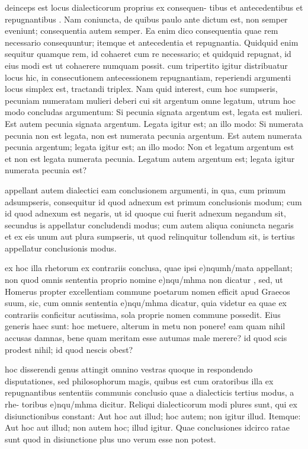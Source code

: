  deinceps est locus dialecticorum proprius ex consequen- tibus et antecedentibus et repugnantibus . Nam coniuncta, de quibus paulo ante dictum est, non semper eveniunt; consequentia autem semper. Ea enim dico consequentia quae rem necessario consequuntur; itemque et antecedentia et repugnantia. Quidquid enim sequitur quamque rem, id cohaeret cum re necessario; et quidquid repugnat, id eius modi est ut cohaerere numquam possit. cum tripertito igitur distribuatur locus hic, in consecutionem antecessionem repugnantiam, reperiendi argumenti locus simplex est, tractandi triplex. Nam quid interest, cum hoc sumpseris, pecuniam numeratam mulieri deberi cui sit argentum omne legatum, utrum hoc modo concludas argumentum: Si pecunia signata argentum est, legata est mulieri. Est autem pecunia signata argentum. Legata igitur est; an illo modo: Si numerata pecunia non est legata, non est numerata pecunia argentum. Est autem numerata pecunia argentum; legata igitur est; an illo modo: Non et legatum argentum est et non est legata numerata pecunia. Legatum autem argentum est; legata igitur numerata pecunia est?

 appellant autem dialectici eam conclusionem argumenti, in qua, cum primum adsumpseris, consequitur id quod adnexum est primum conclusionis modum; cum id quod adnexum est negaris, ut id quoque cui fuerit adnexum negandum sit, secundus is appellatur concludendi modus; cum autem aliqua coniuncta negaris et ex eis unum aut plura sumpseris, ut quod relinquitur tollendum sit, is tertius appellatur conclusionis modus.

 ex hoc illa rhetorum ex contrariis conclusa, quae ipsi e)nqumh/mata appellant; non quod omnis sententia proprio nomine e)nqu/mhma non dicatur , sed, ut Homerus propter excellentiam commune poetarum nomen efficit apud Graecos suum, sic, cum omnis sententia e)nqu/mhma dicatur, quia videtur ea quae ex contrariis conficitur acutissima, sola proprie nomen commune possedit. Eius generis haec sunt: hoc metuere, alterum in metu non ponere! eam quam nihil accusas damnas, bene quam meritam esse autumas male merere? id quod scis prodest nihil; id quod nescis obest?

 hoc disserendi genus attingit omnino vestras quoque in respondendo disputationes, sed philosophorum magis, quibus est cum oratoribus illa ex repugnantibus sententiis communis conclusio quae a dialecticis tertius modus, a rhe- toribus e)nqu/mhma dicitur. Reliqui dialecticorum modi plures sunt, qui ex disiunctionibus constant: Aut hoc aut illud; hoc autem; non igitur illud. Itemque: Aut hoc aut illud; non autem hoc; illud igitur. Quae conclusiones idcirco ratae sunt quod in disiunctione plus uno verum esse non potest.

